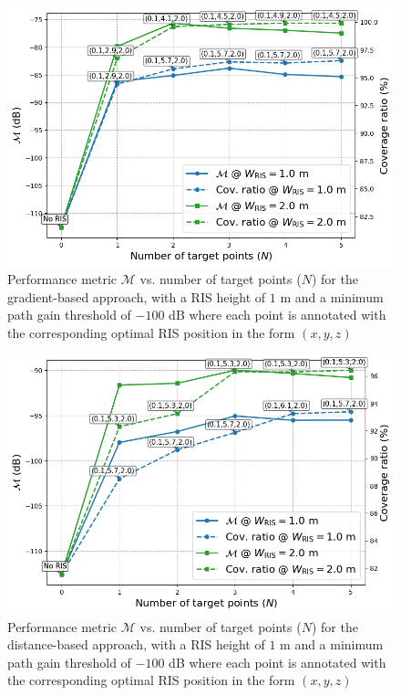 \documentclass{IEEEoj}
\begin{document}
\begin{figure}
	\centering
	\includegraphics[width=\linewidth]{Sim_Results/performance_and_coverage_vs_N_Gradient.png}
	\caption{Performance metric $\mathcal{M}$ vs. number of target points ($N$) for the gradient-based approach, with a RIS height of $1$ m and a minimum path gain threshold of $-100$ dB where each point is annotated with the corresponding optimal RIS position in the form $(x, y, z)$}
	\label{performance_and_coverage_vs_N_Gradient}
\end{figure}

\begin{figure}
	\centering
	\includegraphics[width=\linewidth]{Sim_Results/performance_and_coverage_vs_N_Distance.png}
	\caption{Performance metric $\mathcal{M}$ vs. number of target points ($N$) for the distance-based approach, with a RIS height of $1$ m and a minimum path gain threshold of $-100$ dB where each point is annotated with the corresponding optimal RIS position in the form $(x, y, z)$}
	\label{performance_and_coverage_vs_N_Distance}
\end{figure}
\end{document}
